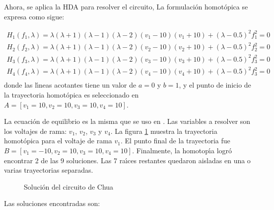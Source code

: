 \documentclass[conference,letterpaper,onecolumn]{IEEEtran}
\begin{document}
{Ahora, se aplica la  HDA para resolver el circuito,
La formulaci\'on homot\'opica se expresa como sigue:

\begin{displaymath}
\begin{array}{c}
H_1(f_1,\lambda)=\lambda(\lambda+1)(\lambda-1)(\lambda-2)(v_1-10)(v_1+10)+(\lambda-0.5)^2 f_1^2=0\\
H_2(f_2,\lambda)=\lambda(\lambda+1)(\lambda-1)(\lambda-2)(v_2-10)(v_2+10)+(\lambda-0.5)^2 f_2^2=0\\
H_3(f_3,\lambda)=\lambda(\lambda+1)(\lambda-1)(\lambda-2)(v_3-10)(v_3+10)+(\lambda-0.5)^2 f_3^2=0\\
H_4(f_4,\lambda)=\lambda(\lambda+1)(\lambda-1)(\lambda-2)(v_4-10)(v_4+10)+(\lambda-0.5)^2 f_3^2=0\\
\end{array}
\end{displaymath}
donde las l\'{\i}neas acotantes tiene un valor de $a=0$ y $b=1$, y el punto
de inicio de la trayectoria homot\'opica es seleccionado en $A=[v_1=10,v_2=10,v_3=10,v_4=10]$.

La ecuaci\'on de equilibrio es la misma que se uso en \cite{homo_chua}.
Las variables a resolver son los voltajes de rama: $v_1$, $v_2$, $v_3$ y
$v_4$. La figura \ref{chuaf} muestra la trayectoria homot\'opica
para el voltaje de rama $v_1$. El punto final de la trayectoria fue  $B=[v_1=-10,v_2=10,v_3=10,v_4=10]$.
Finalmente, la homotop\'{\i}a logr\'o encontrar 2 de las 9 soluciones.
Las 7 ra\'{\i}ces restantes quedaron aisladas en una o varias  trayectorias separadas.


\begin{figure}[hbtp]
\centerline{
\epsfxsize=60mm
\epsfxsize=60mm
}
\caption{Soluci\'on del circuito de Chua}
\label{chuaf}
\end{figure}


Las soluciones encontradas son:

}
\end{document}
